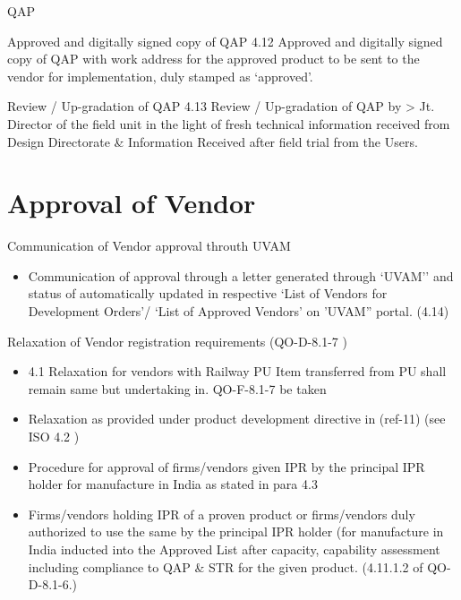 \documentclass[
  10pt,
  ignorenonframetext,
  aspectratio=43,
]{beamer}
\providecommand{\tightlist}{%
  \setlength{\itemsep}{0pt}\setlength{\parskip}{0pt}}
\begin{document}
\begin{frame}{QAP}
\protect\hypertarget{qap}{}
\begin{block}{Approved and digitally signed copy of QAP}
\protect\hypertarget{approved-and-digitally-signed-copy-of-qap}{}
4.12 Approved and digitally signed copy of QAP with work address for the
approved product to be sent to the vendor for implementation, duly
stamped as `approved'.
\end{block}

\begin{block}{Review / Up-gradation of QAP}
\protect\hypertarget{review-up-gradation-of-qap}{}
4.13 Review / Up-gradation of QAP by \textgreater{} Jt. Director of the
field unit in the light of fresh technical information received from
Design Directorate \& Information Received after field trial from the
Users.
\end{block}
\end{frame}

\hypertarget{approval-of-vendor}{%
\section{Approval of Vendor}\label{approval-of-vendor}}

\begin{frame}{Communication of Vendor approval throuth UVAM}
\protect\hypertarget{communication-of-vendor-approval-throuth-uvam}{}
\begin{itemize}
\tightlist
\item
  Communication of approval through a letter generated through `UVAM''
  and status of automatically updated in respective `List of Vendors for
  Development Orders'/ `List of Approved Vendors' on 'UVAM'' portal.
  (4.14)
\end{itemize}
\end{frame}

\begin{frame}{Relaxation of Vendor registration requirements (QO-D-8.1-7
)}
\protect\hypertarget{relaxation-of-vendor-registration-requirements-qo-d-8.1-7}{}
\begin{itemize}
\item
  4.1 Relaxation for vendors with Railway PU Item transferred from PU
  shall remain same but undertaking in. QO-F-8.1-7 be taken
\item
  Relaxation as provided under product development directive in (ref-11)
  (see ISO 4.2 )
\item
  Procedure for approval of firms/vendors given IPR by the principal IPR
  holder for manufacture in India as stated in para 4.3
\item
  Firms/vendors holding IPR of a proven product or firms/vendors duly
  authorized to use the same by the principal IPR holder (for
  manufacture in India inducted into the Approved List after capacity,
  capability assessment including compliance to QAP \& STR for the given
  product. (4.11.1.2 of QO-D-8.1-6.)
\end{itemize}
\end{frame}
\end{document}
